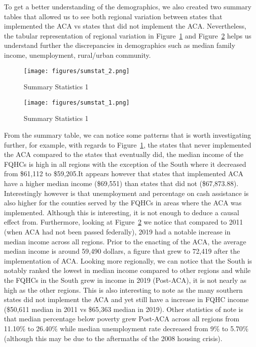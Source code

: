\documentclass[12pt, ]{article}
\begin{document}
To get a better understanding of the demographics, we also created two
summary tables that allowed us to see both regional variation between
states that implemented the ACA vs states that did not implement the
ACA. Nevertheless, the tabular representation of regional variation in
Figure~\ref{fig-4} and Figure~\ref{fig-5} helps us understand further
the discrepancies in demographics such as median family income,
unemployment, rural/urban community.

\newpage{}

\begin{figure}[tbp]

{\centering \texttt{[image: figures/sumstat\_2.png]}

}

\caption{\label{fig-4}Summary Statistics 1}

\end{figure}

\begin{figure}[tbp]

{\centering \texttt{[image: figures/sumstat\_1.png]}

}

\caption{\label{fig-5}Summary Statistics 1}

\end{figure}

From the summary table, we can notice some patterns that is worth
investigating further, for example, with regards to Figure~\ref{fig-4},
the states that never implemented the ACA compared to the states that
eventually did, the median income of the FQHCs is high in all regions
with the exception of the South where it decreased from \$61,112 to
\$59,205.It appears however that states that implemented ACA have a
higher median income (\$69,551) than states that did not (\$67,873.88).
Interestingly however is that unemployment and percentage on cash
assistance is also higher for the counties served by the FQHCs in areas
where the ACA was implemented. Although this is interesting, it is not
enough to deduce a causal effect from. Furthermore, looking at
Figure~\ref{fig-5} we notice that compared to 2011 (when ACA had not
been passed federally), 2019 had a notable increase in median income
across all regions. Prior to the enacting of the ACA, the average median
income is around 59,490 dollars, a figure that grew to 72,419 after the
implementation of ACA. Looking more regionally, we can notice that the
South is notably ranked the lowest in median income compared to other
regions and while the FQHCs in the South grew in income in 2019
(Post-ACA), it is not nearly as high as the other regions. This is also
interesting to note as the many southern states did not implement the
ACA and yet still have a increase in FQHC income (\$50,611 median in
2011 vs \$65,363 median in 2019). Other statistics of note is that
median percentage below poverty grew Post-ACA across all regions from
11.10\% to 26.40\% while median unemployment rate decreased from 9\% to
5.70\% (although this may be due to the aftermaths of the 2008 housing
crisis).
\end{document}
